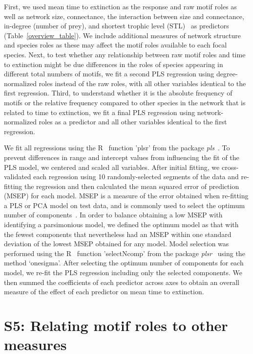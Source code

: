 \documentclass[12pt]{article}
\begin{document}
\begin{spacing}{2.0}
	
	First, we used mean time to extinction as the response and raw motif roles as well as network size, connectance, the interaction between size and connectance, in-degree (number of prey), and shortest trophic level (STL)~\citep{Hairston1993} as predictors (Table~\ref{overview_table}).
	We include additional measures of network structure and species roles as these may affect the motif roles available to each focal species.
	Next, to test whether any relationship between raw motif roles and time to extinction might be due differences in the roles of species appearing in different total numbers of motifs, we fit a second PLS regression using degree-normalized roles instead of the raw roles, with all other variables identical to the first regression.
	Third, to understand whether it is the absolute frequency of motifs or the relative frequency compared to other species in the network that is related to time to extinction, we fit a final PLS regression using network-normalized roles as a predictor and all other variables identical to the first regression.
	
	
	We fit all regressions using the R~\citep{R} function 'plsr' from the package \emph{pls}~\citep{pls}.
	To prevent differences in range and intercept values from influencing the fit of the PLS model, we centered and scaled all variables.
	After initial fitting, we cross-validated each regression using 10 randomly-selected segments of the data and re-fitting the regression and then calculated the mean squared error of prediction (MSEP) for each model.
	MSEP is a measure of the error obtained when re-fitting a PLS or PCA model on test data, and is commonly used to select the optimum number of components~\citep{Mevik2004}.
	In order to balance obtaining a low MSEP with identifying a parsimonious model, we defined the optimum model as that with the fewest components that nevertheless had an MSEP within one standard deviation of the lowest MSEP obtained for any model.
	Model selection was performed using the R~\citep{R} function 'selectNcomp' from the package \emph{plsr}~\citep{pls} using the method `onesigma'.
	After selecting the optimum number of components for each model, we re-fit the PLS regression including only the selected components. 
	We then summed the coefficients of each predictor across axes to obtain an overall measure of the effect of each predictor on mean time to extinction.

\clearpage


\section*{S5: Relating motif roles to other measures}


\end{spacing}
\end{document}
